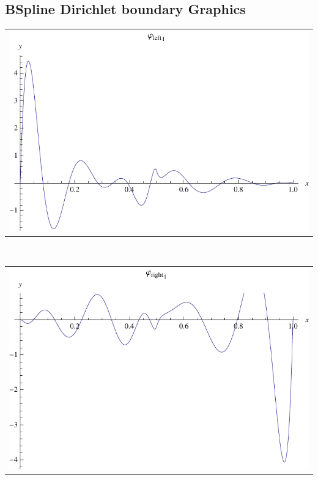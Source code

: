 \documentclass{article}
\begin{document}
\begin{landscape}
\subsection{BSpline Dirichlet boundary Graphics}
\begin{tabular}{c}
\includegraphics[width=20.cm]{nonic_bspline_dleft_1.pdf}\end{tabular} 
 \\ 
\begin{tabular}{c}
\includegraphics[width=20.cm]{nonic_bspline_dright_1.pdf}\end{tabular} 
 \end{landscape}
\end{document}
